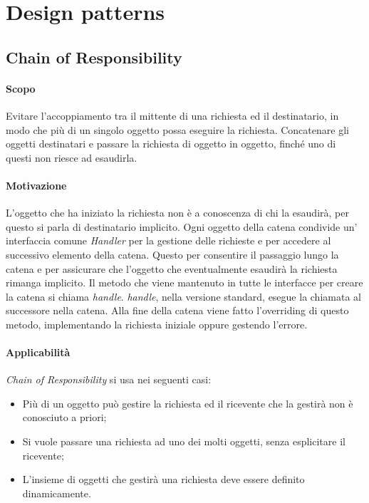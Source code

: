 \section{Design patterns}
\subsection{Chain of Responsibility}\label{Chain of responsibility}
\paragraph{Scopo}
Evitare l'accoppiamento tra il mittente di una richiesta ed il destinatario, in modo che più di un singolo oggetto possa eseguire la richiesta.
Concatenare gli oggetti destinatari e passare la richiesta di oggetto in oggetto, finché uno di questi non riesce ad esaudirla.
\paragraph{Motivazione}
L'oggetto che ha iniziato la richiesta non è a conoscenza di chi la esaudirà, per questo si parla di destinatario implicito.
Ogni oggetto della catena condivide un' interfaccia comune \textit{Handler} per la gestione delle richieste e per accedere al successivo elemento della catena. Questo per consentire il passaggio lungo la catena e per assicurare che l'oggetto che eventualmente esaudirà la richiesta rimanga implicito.
Il metodo che viene mantenuto in tutte le interfacce per creare la catena si chiama \textit{handle}.
\textit{handle}, nella versione standard, esegue la chiamata al successore nella catena. Alla fine della catena viene fatto l'overriding di questo metodo, implementando la richiesta iniziale oppure gestendo l'errore.
\paragraph{Applicabilità}
\textit{Chain of Responsibility} si usa nei seguenti casi:
\begin{itemize}
\item Più di un oggetto può gestire la richiesta ed il ricevente che la gestirà non è conosciuto a priori;
\item Si vuole passare una richiesta ad uno dei molti oggetti, senza esplicitare il ricevente;
\item L'insieme di oggetti che gestirà una richiesta deve essere definito dinamicamente.
\end{itemize}
